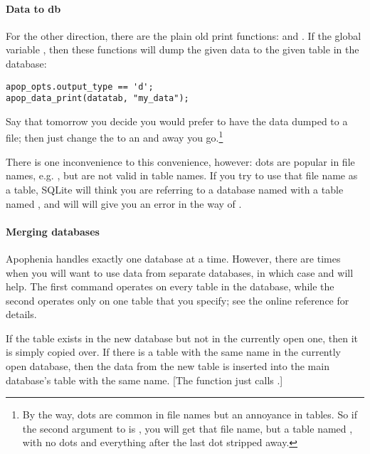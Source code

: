 \paragraph{Data to db} For the other direction, there are the plain old
print functions:  and
. If the global variable
, then these functions will dump the
given data to the given table in the database:
\begin{lstlisting}
apop_opts.output_type == 'd';
apop_data_print(datatab, "my_data");
\end{lstlisting}
Say that tomorrow you decide you would prefer to have the data dumped to
a file; then just change the  to an  and away you go.\footnote{By the way, dots are common in file names but an annoyance in tables. So if the second argument to  is , you will get that file name, but a table named , with no dots and everything after the last dot stripped away.}

There is one inconvenience to this convenience, however: dots are popular
in file names, e.g. , but are not valid in table names. If
you try to use that file name as a table, SQLite will think you are
referring to a database named  with a table named ,
and will will give you an error in the way of .

\paragraph{Merging databases} Apophenia handles exactly one database at
a time. However, there are times when you will want to use data
from separate databases, in which case  and
 will help.  The first command
operates on every table in the database, while the second operates only
on one table that you specify; see the online reference for details.

If the table exists in the new database but not in the currently open
one, then it is simply copied over. If there is a table with the same
name in the currently open database, then the data from the new table is
inserted into the main database's table with the same name. [The function
just calls .]

